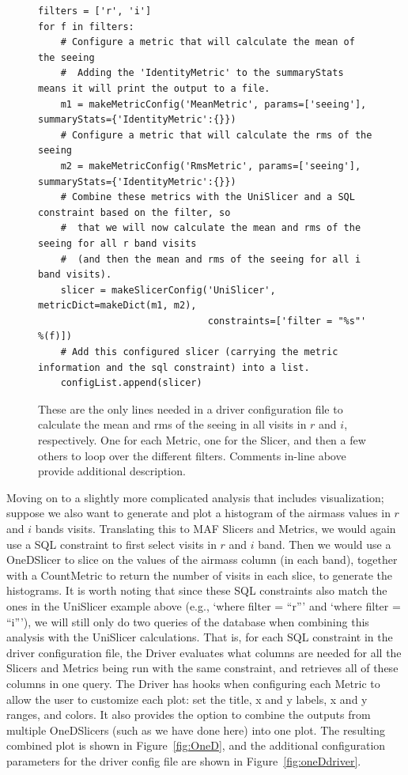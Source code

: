 \documentclass[]{spie}  %
\begin{document}
\begin{figure}
\centering
\begin{lstlisting}[frame=single]
filters = ['r', 'i']
for f in filters:
    # Configure a metric that will calculate the mean of the seeing
    #  Adding the 'IdentityMetric' to the summaryStats means it will print the output to a file.
    m1 = makeMetricConfig('MeanMetric', params=['seeing'], summaryStats={'IdentityMetric':{}})
    # Configure a metric that will calculate the rms of the seeing
    m2 = makeMetricConfig('RmsMetric', params=['seeing'], summaryStats={'IdentityMetric':{}})
    # Combine these metrics with the UniSlicer and a SQL constraint based on the filter, so
    #  that we will now calculate the mean and rms of the seeing for all r band visits
    #  (and then the mean and rms of the seeing for all i band visits).
    slicer = makeSlicerConfig('UniSlicer', metricDict=makeDict(m1, m2),
                              constraints=['filter = "%s"' %(f)])
    # Add this configured slicer (carrying the metric information and the sql constraint) into a list.
    configList.append(slicer)

\end{lstlisting}
\caption[]
{ \label{fig:simpleDriver} These are the only lines needed in a driver
configuration file to calculate the mean and rms of the seeing in all visits in $r$
and $i$, respectively. One for each Metric, one for the Slicer, and
then a few others to loop over the different filters. Comments in-line
above provide additional description.}
\end{figure}

Moving on to a slightly more complicated analysis that includes
visualization; suppose we also want to generate and plot a histogram
of the airmass values in $r$ and $i$ bands visits. Translating this to
MAF Slicers and Metrics, we would again use a SQL constraint to first
select visits in $r$ and $i$ band. Then we would use a OneDSlicer to
slice on the values of the airmass column (in each band), together
with a CountMetric to return the number of visits in each slice, to
generate the histograms. It is worth noting that since these SQL
constraints also match the ones in the UniSlicer example above (e.g.,
`where filter = ``r''' and `where filter = ``i'''), we will still only
do two queries of the database when combining this analysis with the
UniSlicer calculations. That is, for each SQL constraint in the driver
configuration file, the Driver evaluates what columns are needed for
all the Slicers and Metrics being run with the same constraint, and
retrieves all of these columns in one query. The Driver has hooks when
configuring each Metric to allow the user to customize each plot: set
the title, x and y labels, x and y ranges, and colors. It also
provides the option to combine the outputs from multiple OneDSlicers
(such as we have done here) into one plot. The resulting combined plot
is shown in Figure~\ref{fig:OneD}, and the additional configuration
parameters for the driver config file are shown in
Figure~\ref{fig:oneDdriver}. 
\end{document}
